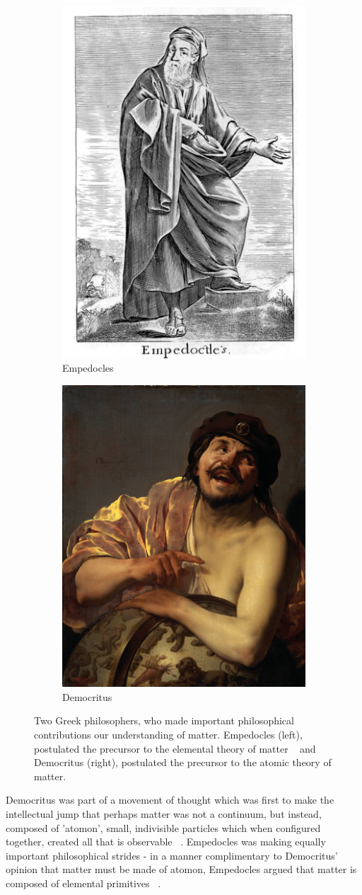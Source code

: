 \begin{figure}[ht]
	\centering
	\begin{subfigure}{.5\textwidth}
		\centering
		\includegraphics[width=0.4\linewidth]{../Chapter2/fig/empedocles.jpg}
		\caption{Empedocles~\cite{Stanley1655}}
		\label{fig:empedocles}
	\end{subfigure}%
	\begin{subfigure}{0.5\textwidth}
		\centering
		\includegraphics[width=0.4\linewidth]{../Chapter2/fig/democritus.jpg}
		\caption{Democritus~\cite{Brugghen1628}}
		\label{fig:democritus}
	\end{subfigure}
	\caption{ Two Greek philosophers, who made important philosophical
		contributions our understanding of matter. Empedocles (left), postulated the
		precursor to the elemental theory of matter ~\needcite{} and Democritus
		(right), postulated the precursor to the atomic theory of matter.  }
	\label{fig:atomists}
\end{figure}

Democritus was part of a movement of thought which was first to make the
intellectual jump that perhaps matter was not a continuum, but instead, composed
of 'atomon', small, indivisible particles which when configured together, created
all that is observable ~\needcite{}. Empedocles was making equally important
philosophical strides - in a manner complimentary to Democritus' opinion that
matter must be made of atomon, Empedocles argued that matter is composed of
elemental primitives ~\needcite{}.

